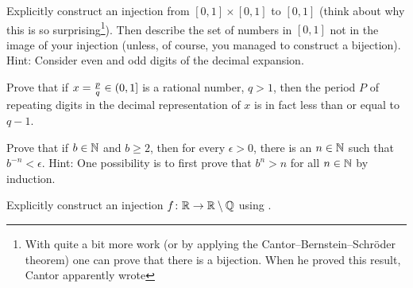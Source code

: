 \begin{exercise}[Challenging]
Explicitly construct an injection from $[0,1] \times [0,1]$ to $[0,1]$ (think about why
this is so surprising\footnote{%
With quite a bit more work (or by applying the
Cantor--Bernstein--Schr\"oder theorem)
one can prove that there is a bijection.
When he proved this result, Cantor apparently wrote
}).
Then describe the set of numbers in $[0,1]$ not in the image of your
injection (unless, of course, you managed to construct a bijection).
Hint: Consider even and odd digits of the decimal expansion.
\end{exercise}

\begin{exercise}
Prove that if $x = \nicefrac{p}{q} \in (0,1]$ is a rational number, $q > 1$,
then the period $P$ of repeating digits in the decimal representation
of $x$ is in fact less than or equal to $q-1$.
\end{exercise}

\begin{exercise} \label{exercise:bnlimit}
Prove that if $b \in \N$ and $b \geq 2$, then for every $\epsilon > 0$,
there is an $n \in \N$ such that 
$b^{-n} < \epsilon$.  Hint:
One possibility is to first prove that $b^n > n$ for all $n \in \N$ by induction.
\end{exercise}

\begin{exercise}
Explicitly construct an injection $f \colon \R \to \R \setminus \Q$ using
.
\end{exercise}
